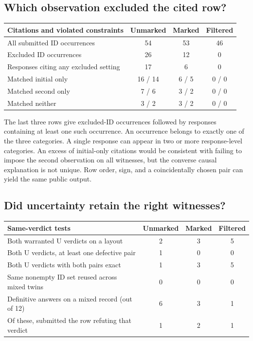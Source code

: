 \documentclass[12pt,letterpaper]{article}
\begin{document}
\subsection{Which observation excluded the cited row?}

\begin{center}{\small\setlength{\tabcolsep}{4pt}\begin{tabularx}{\linewidth}{@{}Yccc@{}}\toprule
Citations and violated constraints & Unmarked & Marked & Filtered\\ \midrule
All submitted ID occurrences & 54 & 53 & 46\\
Excluded ID occurrences & 26 & 12 & 0\\
Responses citing any excluded setting & 17 & 6 & 0\\
Matched initial only & 16 / 14 & 6 / 5 & 0 / 0\\
Matched second only & 7 / 6 & 3 / 2 & 0 / 0\\
Matched neither & 3 / 2 & 3 / 2 & 0 / 0\\\bottomrule\end{tabularx}}\end{center}

The last three rows give excluded-ID occurrences followed by responses containing at least one such occurrence. An occurrence belongs to exactly one of the three categories. A single response can appear in two or more response-level categories. An excess of initial-only citations would be consistent with failing to impose the second observation on all witnesses, but the converse causal explanation is not unique. Row order, sign, and a coincidentally chosen pair can yield the same public output.

\subsection{Did uncertainty retain the right witnesses?}

\begin{center}{\small\setlength{\tabcolsep}{4pt}\begin{tabularx}{\linewidth}{@{}Yccc@{}}\toprule
Same-verdict tests & Unmarked & Marked & Filtered\\ \midrule
Both warranted U verdicts on a layout & 2 & 3 & 5\\
Both U verdicts, at least one defective pair & 1 & 0 & 0\\
Both U verdicts with both pairs exact & 1 & 3 & 5\\
Same nonempty ID set reused across mixed twins & 0 & 0 & 0\\
Definitive answers on a mixed record (out of 12) & 6 & 3 & 1\\
Of these, submitted the row refuting that verdict & 1 & 2 & 1\\\bottomrule\end{tabularx}}\end{center}
\end{document}
